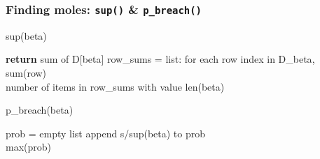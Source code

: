 \documentclass{beamer}
\begin{document}

\begin{frame}[fragile]
\frametitle{Finding moles: \texttt{sup()} \& \texttt{p\_breach()}}
\begin{algorithm}[H]
\caption{sup(beta)}\label{alg:cap}
\begin{algorithmic}
    \State \textbf{return} sum of D[beta]  
\EndIf
\State row\_sums = list: for each row index in D\_{beta}, sum(row)\\
\Return number of items in row\_sums with value len(beta)
\end{algorithmic}
\end{algorithm}

\begin{algorithm}[H]
\caption{p\_breach(beta)}\label{alg:cap}
\begin{algorithmic}
\State prob = empty list
      
    \State append s/sup(beta) to prob\\
\Return max(prob)
\end{algorithmic}
\end{algorithm}
\end{frame}
\end{document}
